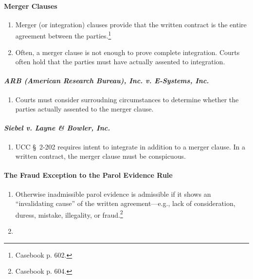 \paragraph{Merger Clauses}

\begin{enumerate}
    \item Merger (or integration) clauses provide that the written contract is 
    the entire agreement between the parties.\footnote{Casebook p. 602.}
    \item Often, a merger clause is not enough to prove complete integration. 
    Courts often hold that the parties must have actually assented to 
    integration.
\end{enumerate}

\paragraph{\emph{ARB (American Research Bureau), Inc. v. E-Systems, Inc.}}

\begin{enumerate}
    \item Courts must consider surroudning circumstances to determine whether 
    the parties actually assented to the merger clause.
\end{enumerate}

\paragraph{\emph{Siebel v. Layne \& Bowler, Inc.}}

\begin{enumerate}
    \item UCC \S\ 2-202 requires intent to integrate in addition to a merger 
    clause. In a written contract, the merger clause must be conspicuous.
\end{enumerate}

\paragraph{The Fraud Exception to the Parol Evidence Rule}

\begin{enumerate}
    \item Otherwise inadmissible parol evidence is admissible if it shows an 
    ``invalidating cause'' of the written agreement---e.g., lack of 
    consideration, duress, mistake, illegality, or fraud.\footnote{Casebook p. 
    604.}
    \item %
\end{enumerate}

